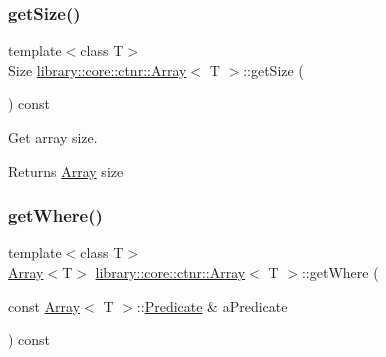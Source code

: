 \subsubsection{\texorpdfstring{getSize()}{getSize()}}
{\footnotesize\ttfamily template$<$class T$>$ \\
Size \mbox{\hyperlink{classlibrary_1_1core_1_1ctnr_1_1_array}{library\+::core\+::ctnr\+::\+Array}}$<$ T $>$\+::get\+Size (\begin{DoxyParamCaption}{ }\end{DoxyParamCaption}) const}



Get array size. 


\begin{DoxyCode}{0}
\end{DoxyCode}


\begin{DoxyReturn}{Returns}
\mbox{\hyperlink{classlibrary_1_1core_1_1ctnr_1_1_array}{Array}} size 
\end{DoxyReturn}
\mbox{\label{classlibrary_1_1core_1_1ctnr_1_1_array_a62069b24d593b2265422cb8f3a149c44}} 
\subsubsection{\texorpdfstring{getWhere()}{getWhere()}}
{\footnotesize\ttfamily template$<$class T$>$ \\
\mbox{\hyperlink{classlibrary_1_1core_1_1ctnr_1_1_array}{Array}}$<$T$>$ \mbox{\hyperlink{classlibrary_1_1core_1_1ctnr_1_1_array}{library\+::core\+::ctnr\+::\+Array}}$<$ T $>$\+::get\+Where (\begin{DoxyParamCaption}\item[{const \mbox{\hyperlink{classlibrary_1_1core_1_1ctnr_1_1_array}{Array}}$<$ T $>$\+::\mbox{\hyperlink{classlibrary_1_1core_1_1ctnr_1_1_array_a74cd325a740870aea490b6b739aa06ae}{Predicate}} \&}]{a\+Predicate }\end{DoxyParamCaption}) const}



